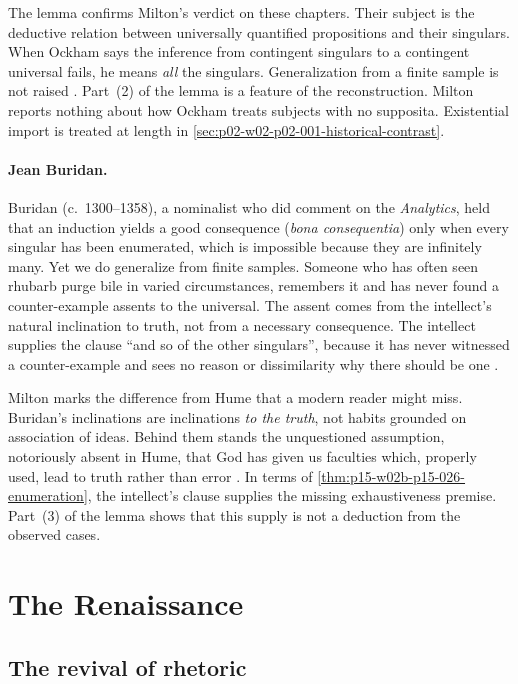 The lemma confirms Milton's verdict on these chapters. Their subject is
the deductive relation between universally quantified propositions and
their singulars. When Ockham says the inference from contingent singulars
to a contingent universal fails, he means \emph{all} the singulars.
Generalization from a finite sample is not raised
\cite[p.~19]{Milton2011InductionBeforeHume}. Part~(2) of the lemma is a
feature of the reconstruction. Milton reports nothing about how Ockham
treats subjects with no supposita. Existential import is treated at length
in \cref{sec:p02-w02-p02-001-historical-contrast}.

\paragraph{Jean Buridan.}
Buridan (c.~1300--1358), a nominalist who did comment on the
\emph{Analytics}, held that an induction yields a good consequence
(\emph{bona consequentia}) only when every singular has been enumerated,
which is impossible because they are infinitely many. Yet we do generalize from
finite samples. Someone who has often seen rhubarb purge bile in varied
circumstances, remembers it and has never found a counter-example assents
to the universal. The assent comes from the intellect's natural inclination
to truth, not from a necessary consequence. The intellect supplies the
clause ``and so of the other singulars'', because it has never witnessed a
counter-example and sees no reason or dissimilarity why there should be one
\cite[pp.~19--20]{Milton2011InductionBeforeHume}.

Milton marks the difference from Hume that a modern reader might miss.
Buridan's inclinations are inclinations \emph{to the truth}, not habits
grounded on association of ideas. Behind them stands the unquestioned
assumption, notoriously absent in Hume, that God has given us faculties
which, properly used, lead to truth rather than error
\cite[p.~20]{Milton2011InductionBeforeHume}. In terms of
\cref{thm:p15-w02b-p15-026-enumeration}, the intellect's clause supplies
the missing exhaustiveness premise. Part~(3) of the lemma shows that this
supply is not a deduction from the observed cases.

\section{The Renaissance}
\label{sec:p15-w02b-p15-026-renaissance}

\subsection{The revival of rhetoric}

